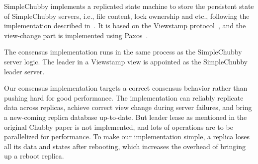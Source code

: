 SimpleChubby implements a replicated state machine to store the persistent
state of SimpleChubby servers, i.e., file content, lock ownership and etc.,
following the implementation described in~\cite{mazieres2007paxos}.
It is based on the Viewstamp protocol~\cite{oki1988viewstamped},
and the view-change part is implemented using Paxos~\cite{lamport2001paxos}.

The consensus implementation runs in the same process
as the SimpleChubby server logic.
The leader in a Viewstamp view is appointed as the SimpleChubby leader server.

Our consensus implementation targets a correct consensus behavior
rather than pushing hard for good performance.
The implementation can reliably replicate data across replicas,
achieve correct view change during server failures,
and bring a new-coming replica database up-to-date.
But leader lease as mentioned in the original Chubby paper is
not implemented,
and lots of operations are to be parallelized for performance.
To make our implementation simple,
a replica loses all its data and states after rebooting,
which increases the overhead of bringing up a reboot replica.

%
%
%
%
